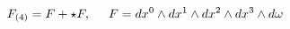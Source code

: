 \begin{equation}
F_{(4)}=  F +\star F, \hspace{0.5cm} F
= dx^{0}\wedge dx^{1}\wedge dx^{2}\wedge dx^{3}\wedge d\omega
\end{equation}


